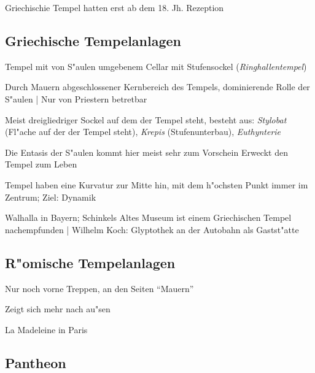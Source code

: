 \documentclass[emulatestandardclasses]{scrartcl}
\begin{document}
Griechischie Tempel hatten erst ab dem 18. Jh. Rezeption

\subsection{Griechische Tempelanlagen}

\begin{description}[leftmargin=!,labelwidth=\widthof{\bfseries Nachempfindung}]
  \item[Peripteros] Tempel mit von S"aulen umgebenem Cellar mit Stufensockel (\emph{Ringhallentempel})
  \item[Cellar] Durch Mauern abgeschlossener Kernbereich des Tempels, dominierende Rolle der S"aulen | Nur von Priestern betretbar
  \item[Stufensockel] Meist dreigliedriger Sockel auf dem der Tempel steht, besteht aus: \emph{Stylobat} (Fl"ache auf der der Tempel steht), \emph{Krepis} (Stufenunterbau), \emph{Euthynterie}
  \item[Entasis] Die Entasis der S"aulen kommt hier meist sehr zum Vorschein Erweckt den Tempel zum Leben 
  \item[Kurvatur] Tempel haben eine Kurvatur zur Mitte hin, mit dem h"ochsten Punkt immer im Zentrum; Ziel: Dynamik
  \item[Nachempfindung] Walhalla in Bayern; Schinkels Altes Museum ist einem Griechischen Tempel nachempfunden | Wilhelm Koch: Glyptothek an der Autobahn als Gastst"atte
\end{description}

\subsection{R"omische Tempelanlagen}

\begin{description}[leftmargin=!,labelwidth=\widthof{\bfseries Nachempfindung}]
  \item[Podiumssockel] Nur noch vorne Treppen, an den Seiten "`Mauern"'
  \item[Cellar] Zeigt sich mehr nach au"sen
  \item[Nachempfindung] La Madeleine in Paris
\end{description}

\subsection{Pantheon}
\end{document}
